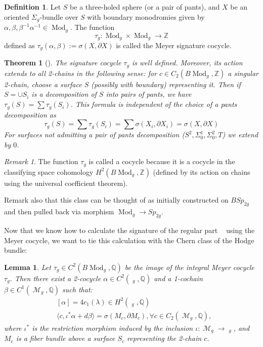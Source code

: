 \documentclass{article}
\DeclareMathOperator{\dm}{\overline{\mathcal{M}}}
\DeclareMathOperator{\m}{\mathcal{M}}
\DeclareMathOperator{\mo}{\text{Mod}}
\DeclareMathOperator{\xreg}{X_{\text{reg.}}}
\theoremstyle{plain}
\newtheorem{lem}{Lemma}[section]
\newtheorem{thm}{Theorem}[section]
\theoremstyle{remark}
\newtheorem*{rem}{Remark}
\theoremstyle{definition}
\newtheorem{defin}{Definition}[section]
\begin{document}
\begin{defin}
    Let $S$ be a three-holed sphere (or a pair of pants), and $X$ be an oriented $\Sigma_g$-bundle over $S$ with boundary monodromies given by $\alpha, \beta, \beta^{-1}\alpha^{-1} \in \mo_g$. The function 
    $$\tau_g : \mo_g \times \mo_g \to \mathbb{Z}$$
    defined as $\tau_g(\alpha, \beta):= \sigma(X, \partial X)$ is called the Meyer signature cocycle.
\end{defin}
\begin{thm} [\cite{Meyer}]
    The signature cocycle $\tau_g$ is well defined. Moreover, its action extends to all 2-chains in the following sense\thinspace: for $c\in C_2(B\mo_g, \mathbb{Z})$ a singular 2-chain, choose a surface $S$ (possibly with boundary) representing it. Then if $S = \cup S_i$ is a decomposition of $S$ into pairs of pants, we have $\tau_g(S) = \sum \tau_g(S_i)$. This formula is independent of the choice of a pants decomposition as 
    $$\tau_g(S) = \sum \tau_g(S_i) = \sum \sigma(X_i, \partial X_i) = \sigma(X, \partial X)$$
    For surfaces not admitting a pair of pants decomposition ($S^2, \Sigma_0^1,\Sigma_0^2, T$) we extend by $0$.
\end{thm}
\begin{rem}
    The function $\tau_g$ is called a cocycle because it is a cocycle in the classifying space cohomology $H^2(B\mo_g, \mathbb{Z})$ (defined by its action on chains using the universal coefficient theorem). \par 
    Remark also that this class can be thought of as initially constructed on $BSp_{2g}$ and then pulled back via morphism $\mo_g \to Sp_{2g}$.
\end{rem}
Now that we know how to calculate the signature of the regular part $\xreg$ using the Meyer cocycle, we want to tie this calculation with the Chern class of the Hodge bundle\thinspace:
\begin{lem}
    Let $\tau_g \in C^2(B\mo_g, \mathbb{Q})$ be the image of the integral Meyer cocycle $\tau_g$. Then there exist a 2-cocycle $\alpha \in C^2(\dm_g, \mathbb{Q})$ and a 1-cochain $\beta \in C^1(\m_g, \mathbb{Q})$ such that\thinspace:
    \begin{align*}
        &[\alpha] = 4c_1(\lambda) \in H^2(\dm_g, \mathbb{Q}) \\
        &\langle c, \iota^*\alpha + d\beta\rangle = \sigma(M_c,\partial M_c),  \forall c \in C_2(\m_g,\mathbb{Q}),
    \end{align*}
    where $\iota^*$ is the restriction morphism induced by the inclusion $\iota : \m_g \to \dm_g$, and $M_c$ is a fiber bundle above a surface $S_c$ representing the 2-chain $c$.
\end{lem}
\end{document}
